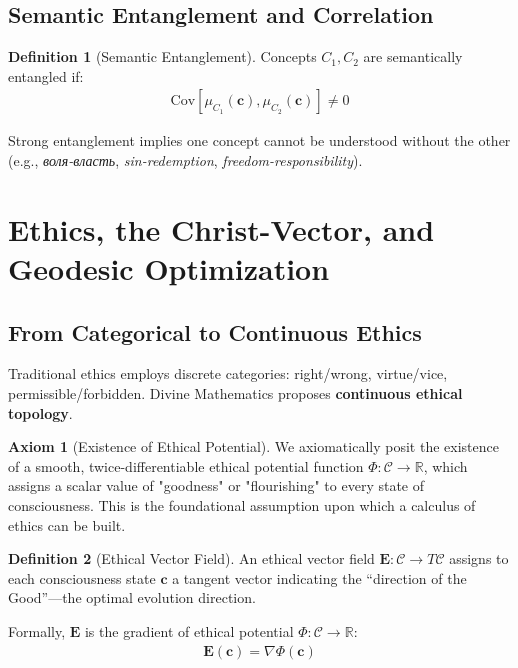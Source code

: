 \documentclass[11pt,a4paper]{article}
\theoremstyle{definition}
\newtheorem{definition}{Definition}[section]
\newtheorem{axiom}{Axiom}[section]
\theoremstyle{remark}
\newcommand{\RR}{\mathbb{R}}
\newcommand{\CC}{\mathcal{C}}
\newcommand{\EE}{\mathbf{E}}
\newcommand{\cc}{\mathbf{c}}
\begin{document}
\subsection{Semantic Entanglement and Correlation}

\begin{definition}[Semantic Entanglement]
Concepts \(C_1, C_2\) are semantically entangled if:
\begin{align}
\text{Cov}[\mu_{C_1}(\cc), \mu_{C_2}(\cc)] \neq 0
\end{align}

Strong entanglement implies one concept cannot be understood without the other (e.g., \textit{воля-власть}, \textit{sin-redemption}, \textit{freedom-responsibility}).
\end{definition}

\section{Ethics, the Christ-Vector, and Geodesic Optimization}

\subsection{From Categorical to Continuous Ethics}

Traditional ethics employs discrete categories: right/wrong, virtue/vice, permissible/forbidden. Divine Mathematics proposes \textbf{continuous ethical topology}.

\begin{axiom}[Existence of Ethical Potential]
We axiomatically posit the existence of a smooth, twice-differentiable ethical potential function \(\Phi: \CC \to \RR\), which assigns a scalar value of "goodness" or "flourishing" to every state of consciousness. This is the foundational assumption upon which a calculus of ethics can be built.
\end{axiom}

\begin{definition}[Ethical Vector Field]
An ethical vector field \(\EE: \CC \to T\CC\) assigns to each consciousness state \(\cc\) a tangent vector indicating the ``direction of the Good''—the optimal evolution direction.

Formally, \(\EE\) is the gradient of ethical potential \(\Phi: \CC \to \RR\):
\begin{align}
\EE(\cc) = \nabla \Phi(\cc)
\end{align}
\end{definition}
\end{document}
